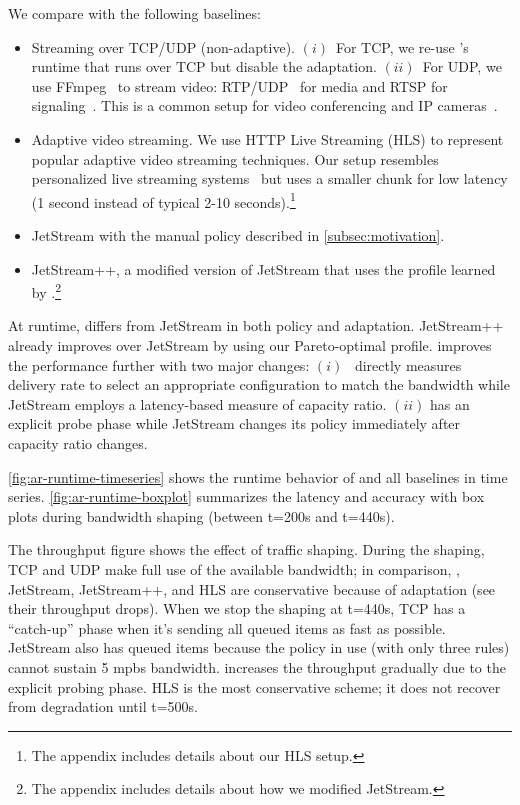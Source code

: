 We compare \sysname{} with the following baselines:

\begin{itemize}[noitemsep, nolistsep, leftmargin=*]

\item Streaming over TCP/UDP (non-adaptive). $(i)$~For TCP, we re-use
  \sysname{}'s runtime that runs over TCP but disable the adaptation. $(ii)$~For
  UDP, we use FFmpeg~\cite{bellard2012ffmpeg} to stream video:
  RTP/UDP~\cite{schulzrinne2006rtp} for media and RTSP for
  signaling~\cite{schulzrinne1998rtsp}. This is a common setup for video
  conferencing and IP cameras~\cite{durresi2005rtp, king2009cisco}.

\item Adaptive video streaming. We use HTTP Live Streaming (HLS) to represent
  popular adaptive video streaming techniques. Our setup resembles personalized
  live streaming systems~\cite{wang2016anatomy} but uses a smaller chunk for low
  latency (1 second instead of typical 2-10 seconds).\footnote{The appendix
    includes details about our HLS setup.}

\item JetStream with the manual policy described in \autoref{subsec:motivation}.

\item JetStream++, a modified version of JetStream that uses the profile learned
  by \sysname{}.\footnote{The appendix includes details about how we modified
    JetStream.}

\end{itemize}

At runtime, \sysname{} differs from JetStream in both policy and
adaptation. JetStream++ already improves over JetStream by using our
Pareto-optimal profile. \sysname{} improves the performance further with two
major changes: $(i)$~\sysname{} directly measures delivery rate to select an
appropriate configuration to match the bandwidth while JetStream employs a
latency-based measure of capacity ratio. $(ii)$ \sysname{} has an explicit probe
phase while JetStream changes its policy immediately after capacity ratio
changes.

 \autoref{fig:ar-runtime-timeseries} shows the runtime behavior
of \sysname{} and all baselines in time series. \autoref{fig:ar-runtime-boxplot}
summarizes the latency and accuracy with box plots during bandwidth shaping
(between t=200s and t=440s).

The throughput figure shows the effect of traffic shaping. During the shaping,
TCP and UDP make full use of the available bandwidth; in comparison, \sysname{},
JetStream, JetStream++, and HLS are conservative because of adaptation (see
their throughput drops). When we stop the shaping at t=440s, TCP has a
``catch-up'' phase when it's sending all queued items as fast as
possible. JetStream also has queued items because the policy in use (with only
three rules) cannot sustain 5 mpbs bandwidth. \sysname{} increases the
throughput gradually due to the explicit probing phase. HLS is the most
conservative scheme; it does not recover from degradation until t=500s.

